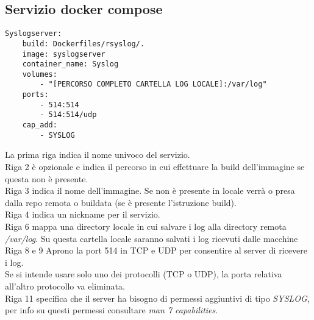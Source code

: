 \documentclass[../DocumentazioneProgetto.tex]{subfiles}
\begin{document}
\subsection{Servizio docker compose} 
\begin{lstlisting}[caption=Rsyslog Docker Compose] 
Syslogserver:
	build: Dockerfiles/rsyslog/.
	image: syslogserver
	container_name: Syslog
	volumes:
		- "[PERCORSO COMPLETO CARTELLA LOG LOCALE]:/var/log"
	ports:
		- 514:514
		- 514:514/udp
	cap_add:
		- SYSLOG\end{lstlisting}
La prima riga indica il nome univoco del servizio.\\
Riga 2 è opzionale e indica il percorso in cui effettuare la build dell'immagine se questa non è presente.\\
Riga 3 indica il nome dell'immagine. Se non è presente in locale verrà o presa dalla repo remota o buildata (se è presente l'istruzione build).\\
Riga 4 indica un nickname per il servizio.\\
Riga 6 mappa una directory locale in cui salvare i log alla directory remota \textit{/var/log}. Su questa cartella locale saranno salvati i log ricevuti dalle macchine\\
Riga 8 e 9 Aprono la port 514 in TCP e UDP per consentire al server di ricevere i log.\\
Se si intende usare solo uno dei protocolli (TCP o UDP), la porta relativa all'altro protocollo va eliminata.\\
Riga 11 specifica che il server ha bisogno di permessi aggiuntivi di tipo \textit{SYSLOG}, per info su questi permessi consultare \textit{man 7 capabilities}. 
		
\end{document}
